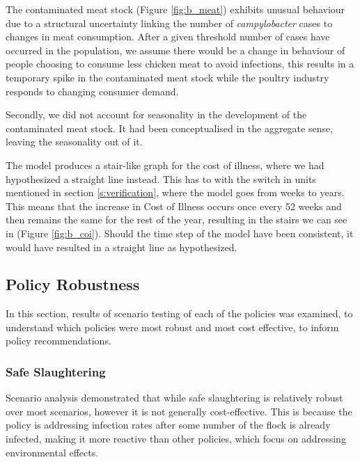 The contaminated meat stock (Figure \ref{fig:b_meat}) exhibits unusual behaviour due to a structural uncertainty linking the number of \textit{campylobacter} cases to changes in meat consumption. After a given threshold number of cases have occurred in the population, we assume there would be a change in behaviour of people choosing to consume less chicken meat to avoid infections, this results in a temporary spike in the contaminated meat stock while the poultry industry responds to changing consumer demand.

Secondly, we did not account for seasonality in the development of the contaminated meat stock. It had been conceptualised in the aggregate sense, leaving the seasonality out of it. 

The model produces a stair-like graph for the cost of illness, where we had hypothesized a straight line instead. This has to with the switch in units mentioned in section \ref{s:verification}, where the model goes from weeks to years. This means that the increase in Cost of Illness occurs once every 52 weeks and then remains the same for the rest of the year, resulting in the stairs we can see in (Figure \ref{fig:b_coi}). Should the time step of the model have been consistent, it would have resulted in a straight line as hypothesized. 


\subsection{Policy Robustness}
In this section, results of scenario testing of each of the policies was examined, to understand which policies were most robust and most cost effective, to inform policy recommendations.

\subsubsection{Safe Slaughtering}
\label{sec: safe slaughtering}
Scenario analysis demonstrated that while safe slaughtering is relatively robust over most scenarios, however it is not generally cost-effective. This is because the policy is addressing infection rates after some number of the flock is already infected, making it more reactive than other policies, which focus on addressing environmental effects.

